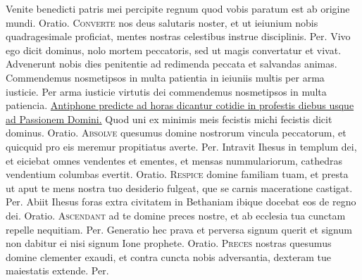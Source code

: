 \begin{multicols*}{2}
 Venite benedicti patris mei percipite regnum quod vobis paratum est ab origine mundi. {\color{Red} Oratio.}
\lettrine[lines=2]{\zallmancaps \color{Blue} C}{onverte} nos deus salutaris noster, et ut ieiunium nobis quadragesimale proficiat, mentes nostras celestibus instrue disciplinis. Per.
 Vivo ego dicit dominus, nolo mortem peccatoris, sed ut magis convertatur et vivat.
 Advenerunt nobis dies penitentie ad redimenda peccata et salvandas animas.
 Commendemus nosmetipsos in multa patientia in ieiuniis multis per arma iusticie.
 Per arma iusticie virtutis dei commendemus nosmetipsos in multa patiencia.
\newline \ul{Antiphone predicte ad horas dicantur cotidie in profestis diebus usque ad Passionem Domini.}
 Quod uni ex minimis meis fecistis michi fecistis dicit dominus. {\color{Red} Oratio.}
\lettrine[lines=2]{\zallmancaps \color{Red} A}{bsolve} quesumus domine nostrorum vincula peccatorum, et quicquid pro eis meremur propitiatus averte. Per.
 Intravit Ihesus in templum dei, et eiciebat omnes vendentes et ementes, et mensas nummulariorum, cathedras vendentium columbas evertit. {\color{Red} Oratio.}
\lettrine[lines=2]{\zallmancaps \color{Blue} R}{espice} domine familiam tuam, et presta ut aput te mens nostra tuo desiderio fulgeat, que se carnis maceratione castigat. Per.
 Abiit Ihesus foras extra civitatem in Bethaniam ibique docebat eos de regno dei. {\color{Red} Oratio.}
\lettrine[lines=2]{\zallmancaps \color{Red} A}{scendant} ad te domine preces nostre, et ab ecclesia tua cunctam repelle nequitiam. Per.
 Generatio hec prava et perversa signum querit et signum non dabitur ei nisi signum Ione prophete. {\color{Red} Oratio.}
\lettrine[lines=2]{\zallmancaps \color{Blue} P}{reces} nostras quesumus domine clementer exaudi, et contra cuncta nobis adversantia, dexteram tue maiestatis extende. Per.

\end{multicols*}
